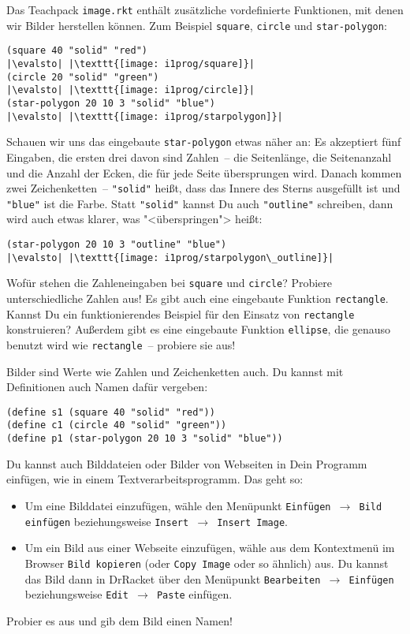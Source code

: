 Das Teachpack \texttt{image.rkt} enthält zusätzliche vordefinierte
Funktionen, mit denen wir Bilder herstellen können.  Zum Beispiel
\lstinline{square}, \lstinline{circle} und \lstinline{star-polygon}:
%
\begin{lstlisting}
(square 40 "solid" "red")
|\evalsto| |\texttt{[image: i1prog/square]}|
(circle 20 "solid" "green")
|\evalsto| |\texttt{[image: i1prog/circle]}|
(star-polygon 20 10 3 "solid" "blue")
|\evalsto| |\texttt{[image: i1prog/starpolygon]}|
\end{lstlisting}
%
Schauen wir uns das eingebaute \lstinline{star-polygon} etwas näher an:
Es akzeptiert fünf Eingaben, die ersten drei davon sind Zahlen~-- die
Seitenlänge, die Seitenanzahl und die Anzahl der Ecken, die für jede
Seite übersprungen wird.  Danach kommen zwei Zeichenketten~--
\lstinline{"solid"} heißt, dass das Innere des Sterns ausgefüllt ist und
\lstinline{"blue"} ist die Farbe.  Statt \lstinline{"solid"} kannst Du auch
\lstinline{"outline"} schreiben, dann wird auch etwas klarer, was
"<überspringen"> heißt:
%
\begin{lstlisting}
(star-polygon 20 10 3 "outline" "blue")
|\evalsto| |\texttt{[image: i1prog/starpolygon\_outline]}|
\end{lstlisting}
%
\begin{aufgabeinline}
  Wofür stehen die Zahleneingaben bei \lstinline{square} und
  \lstinline{circle}?  Probiere unterschiedliche Zahlen aus!  Es gibt
  auch eine eingebaute Funktion \lstinline{rectangle}.  Kannst Du ein
  funktionierendes Beispiel für den Einsatz von \lstinline{rectangle}
  konstruieren?  Außerdem gibt es eine eingebaute Funktion
  \lstinline{ellipse}, die genauso benutzt wird wie \lstinline{rectangle}~--
  probiere sie aus!
\end{aufgabeinline}
%
Bilder sind Werte wie Zahlen und Zeichenketten auch.  Du kannst
mit Definitionen auch Namen dafür vergeben:
%
\begin{lstlisting}
(define s1 (square 40 "solid" "red"))
(define c1 (circle 40 "solid" "green"))
(define p1 (star-polygon 20 10 3 "solid" "blue"))
\end{lstlisting}
%
\begin{aufgabeinline}
  Du kannst auch Bilddateien oder Bilder von Webseiten in Dein Programm
  einfügen, wie in einem Textverarbeitsprogramm. Das geht so:
  \begin{itemize}
    \item Um eine Bilddatei einzufügen, wähle den Menüpunkt
      \texttt{Einfügen $\rightarrow$ Bild einfügen} beziehungsweise
      \texttt{Insert $\rightarrow$ Insert Image}.
    \item Um ein Bild aus einer Webseite einzufügen, wähle aus dem
      Kontextmenü im Browser \texttt{Bild kopieren} (oder \texttt{Copy
      Image} oder so ähnlich) aus.  Du kannst das Bild dann in
    DrRacket über den Menüpunkt \texttt{Bearbeiten $\rightarrow$ Einfügen}
    beziehungsweise \texttt{Edit $\rightarrow$ Paste} einfügen.
  \end{itemize}
  Probier es aus und
  gib dem Bild einen Namen!
\end{aufgabeinline}
